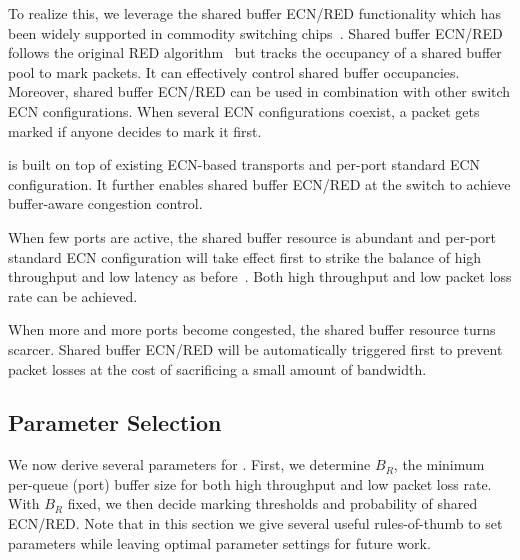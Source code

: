 To realize this, we leverage the shared buffer ECN/RED functionality which has been widely supported in commodity switching chips~\cite{arista_ecn,mqecn}. Shared buffer ECN/RED follows the original RED algorithm~\cite{RED} but tracks the occupancy of a shared buffer pool to mark packets. It can effectively control shared buffer occupancies. Moreover, shared buffer ECN/RED can be used in combination with other switch ECN configurations. When several ECN configurations coexist, a packet gets marked if anyone decides to mark it first.

\sys is built on top of existing ECN-based transports and per-port standard ECN configuration. It further enables shared buffer ECN/RED at the switch to achieve buffer-aware congestion control.
\vspace{-1mm}
\begin{icompact}
\item When few ports are active, the shared buffer resource is abundant and per-port standard ECN configuration will take effect first to strike the balance of high throughput and low latency as before~\cite{dctcp}. Both high throughput and low packet loss rate can be achieved.
\vspace{-1mm}
\item When more and more ports become congested, the shared buffer resource turns scarcer. Shared buffer ECN/RED will be automatically triggered first to prevent packet losses at the cost of sacrificing a small amount of bandwidth.
\vspace{-1mm}
\end{icompact}

\subsection{Parameter Selection}\label{subsec:parameter}
We now derive several parameters for \sys. First, we determine $B_R$, the minimum per-queue (port) buffer size for both high throughput and low packet loss rate. With $B_R$ fixed, we then decide marking thresholds and probability of shared ECN/RED. Note that in this section we give several useful rules-of-thumb to set parameters while leaving optimal parameter settings for future work.


